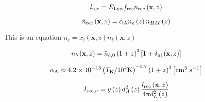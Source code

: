\begin{equation}
  l_{\rm rec} = E_{\rm Ly\alpha} f_{\rm rec} \dot{n}_{\rm rec} \left( \textbf{x}, z \right)
\end{equation}

\begin{equation}
  \dot{n}_{\rm rec} \left( \textbf{x}, z \right) = \alpha_{\rm A} n_{e} \left(z \right) n_{HII} \left(z \right)
\end{equation}

This is an equation $n_{e} = x_i \left( \textbf{x}, z \right) n_{b} \left( \textbf{x}, z \right) $

\begin{equation}
  n_{b} \left( \textbf{x}, z \right) = \bar{n}_{b, 0} \left( 1 + z\right)^3 \left[1 + \delta_{\rm nl} \left( \textbf{x}, z\right) \right]
\end{equation}

\begin{equation}
  \alpha_{\rm A} \approx 4.2 \times 10^{-13} \left( T_{\rm K} / 10^4 {\rm K} \right)^{-0.7} \left( 1 + z\right)^3 \left[\rm  cm^3 \ s^{-1} \right]
\end{equation}

\begin{equation}
I_{\rm rec, \nu} = y \left(z \right) d_A^2 \left(z \right) \frac{l_{\rm rec} \left( \textbf{x}, z \right)}{4 \pi d_L^2 \left( z \right)}
\end{equation}
